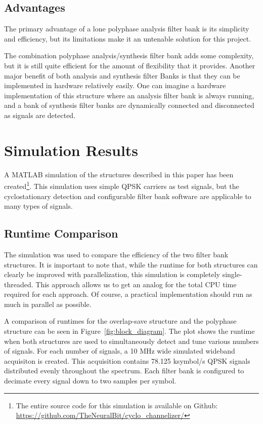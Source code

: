\documentclass[12pt]{article}
\begin{document}
\subsection{Advantages}
\label{sec:poly_advantages}
The primary advantage of a lone polyphase analysis filter bank is its
simplicity and efficiency, but its limitations make it an untenable solution
for this project.

The combination polyphase analysis/synthesis filter bank adds some complexity,
but it is still quite efficient for the amount of flexibility that it provides.
Another major benefit of both analysis and synthesis filter Banks is that they
can be implemented in hardware relatively easily. One can imagine a hardware
implementation of this structure where an analysis filter bank is always
running, and a bank of synthesis filter banks are dynamically connected and
disconnected as signals are detected.



\section{Simulation Results}
\label{sec:sim}

A MATLAB simulation of the structures described in this paper has been
created\footnote{The entire source code for this simulation is available on
Github: \url{https://github.com/TheNeuralBit/cyclo_channelizer/}}. This
simulation uses simple QPSK carriers as test signals, but the cyclostationary
detection and configurable filter bank software are applicable to many types of
signals.

\subsection{Runtime Comparison}
\label{sec:sim_runtime}

The simulation was used to compare the efficiency of the two filter bank
structures. It is important to note that, while the runtime for both structures
can clearly be improved with parallelization, this simulation is completely
single-threaded. This approach allows us to get an analog for the total CPU
time required for each approach. Of course, a practical implementation should
run as much in parallel as possible.

A comparison of runtimes for the overlap-save structure and the polyphase
structure can be seen in Figure~\ref{fig:block_diagram}. The plot shows the
runtime when both structures are used to simultaneously detect and tune various
numbers of signals. For each number of signals, a 10 MHz wide simulated
wideband acquisiton is created. This acquisition contains 78.125 ksymbol/s QPSK
signals distributed evenly throughout the spectrum. Each filter bank is
configured to decimate every signal down to two samples per symbol.
\end{document}
